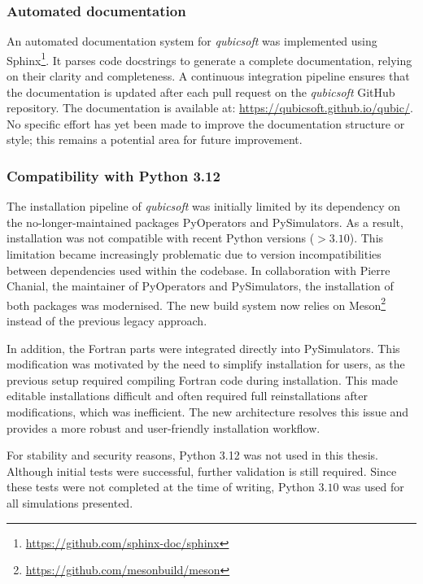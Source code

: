 \documentclass[../../thesis.tex]{subfiles}
\begin{document}
\subsubsection{Automated documentation}

An automated documentation system for \emph{qubicsoft} was implemented using Sphinx\footnote{\url{https://github.com/sphinx-doc/sphinx}}. It parses code docstrings to generate a complete documentation, relying on their clarity and completeness. A continuous integration pipeline ensures that the documentation is updated after each pull request on the \emph{qubicsoft} GitHub repository. The documentation is available at: \url{https://qubicsoft.github.io/qubic/}. No specific effort has yet been made to improve the documentation structure or style; this remains a potential area for future improvement.

\subsubsection{Compatibility with Python 3.12}
\label{subsub:installation}

The installation pipeline of \emph{qubicsoft} was initially limited by its dependency on the no-longer-maintained packages PyOperators and PySimulators. As a result, installation was not compatible with recent Python versions ($> 3.10$). This limitation became increasingly problematic due to version incompatibilities between dependencies used within the codebase.
In collaboration with Pierre Chanial, the maintainer of PyOperators and PySimulators, the installation of both packages was modernised. The new build system now relies on Meson\footnote{\url{https://github.com/mesonbuild/meson}} instead of the previous legacy approach.

In addition, the Fortran parts were integrated directly into PySimulators. This modification was motivated by the need to simplify installation for users, as the previous setup required compiling Fortran code during installation. This made editable installations difficult and often required full reinstallations after modifications, which was inefficient. The new architecture resolves this issue and provides a more robust and user-friendly installation workflow.

For stability and security reasons, Python 3.12 was not used in this thesis. Although initial tests were successful, further validation is still required. Since these tests were not completed at the time of writing, Python $3.10$ was used for all simulations presented.
\end{document}
